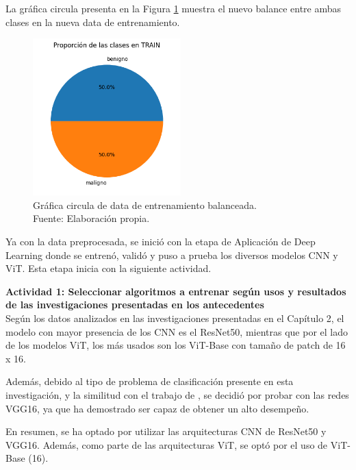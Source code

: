 La gráfica circula presenta en la Figura \ref{4:fig119} muestra el nuevo balance entre ambas clases en la nueva data de entrenamiento.

\begin{figure}[H]
	\begin{center}
		\includegraphics[width=0.51\textwidth]{4/figures/balanced_circular.png}
		\caption[Gráfica circula de data de entrenamiento balanceada]{Gráfica circula de data de entrenamiento balanceada. \\
		Fuente: Elaboración propia.}
		\label{4:fig119}
	\end{center}
\end{figure}

Ya con la data preprocesada, se inició con la etapa de Aplicación de Deep Learning donde se entrenó, validó y puso a prueba los diversos modelos CNN y ViT. Esta etapa inicia con la siguiente actividad.

\textbf{Actividad 1: Seleccionar algoritmos a entrenar según usos y resultados de las investigaciones presentadas en los antecedentes}
\\
Según los datos analizados en las investigaciones presentadas en el Capítulo 2, el modelo con mayor presencia de los CNN es el ResNet50, mientras que por el lado de los modelos ViT, los más usados son los ViT-Base con tamaño de patch de 16 x 16.

Además, debido al tipo de problema de clasificación presente en esta investigación, y la similitud con el trabajo de \cite{pr_JERBI2023autoclassViTGAN}, se decidió por probar con las redes VGG16, ya que ha demostrado ser capaz de obtener un alto desempeño.

En resumen, se ha optado por utilizar las arquitecturas CNN de ResNet50 y VGG16. Además, como parte de las arquitecturas ViT, se optó por el uso de ViT-Base (16).

